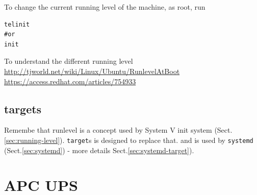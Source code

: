 To change the current running level of the machine, as root, run
\begin{verbatim}
telinit 
#or 
init
\end{verbatim}

To understand the different running level
\url{http://tjworld.net/wiki/Linux/Ubuntu/RunlevelAtBoot}
\url{https://access.redhat.com/articles/754933}






\subsection{targets}
\label{sec:targets}

Remembe that runlevel is a concept used by System V init system
(Sect.\ref{sec:running-level}). \verb!target!s is designed to replace that. and
is used by \verb!systemd! (Sect.\ref{sec:systemd}) - more details
Sect.\ref{sec:systemd-target}).


\section{APC UPS}

